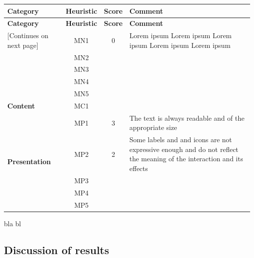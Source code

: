 \begin{tabularx}{\linewidth}{l c c X}
\toprule
\textbf{Category} & \textbf{Heuristic} & \textbf{Score} & \textbf{Comment} \\
\midrule
\endfirsthead
\toprule
\textbf{Category} & \textbf{Heuristic} & \textbf{Score} & \textbf{Comment} \\
\midrule
\endhead
\midrule
\footnotesize [Continues on next page]
\endfoot
\bottomrule
\endlastfoot

\multirow{5}{*}{\textbf{Navigation}}   & MN1 & 0 & Lorem ipsum Lorem ipsum Lorem ipsum Lorem ipsum Lorem ipsum \\ \cmidrule{2-4} 
                                        & MN2 &  &  \\ \cmidrule{2-4} 
                                        & MN3 &  &  \\ \cmidrule{2-4} 
                                        & MN4 &  &  \\ \cmidrule{2-4} 
                                        & MN5 &  &  \\ \midrule
\textbf{Content}                       & MC1 &  &  \\ \midrule
\multirow{5}{*}{\textbf{Presentation}} & MP1 & 3 & The text is always readable and of the appropriate size \\ \cmidrule{2-4} 
                                        & MP2 & 2 & Some labels and and icons are not expressive enough and do not reflect the meaning of the interaction and its effects\\ \cmidrule{2-4} 
                                        & MP3 & & \\ \cmidrule{2-4} 
                                        & MP4 &  &  \\ \cmidrule{2-4} 
                                        & MP5 &  &
\end{tabularx}

bla bl
\subsection{Discussion of results}
